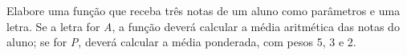 
\question[10]

Elabore uma função que receba três notas de um aluno como parâmetros e uma letra. Se a letra for \textit{A}, a função deverá calcular a média aritmética das notas do aluno; se for \textit{P}, deverá calcular a média ponderada, com pesos 5, 3 e 2.